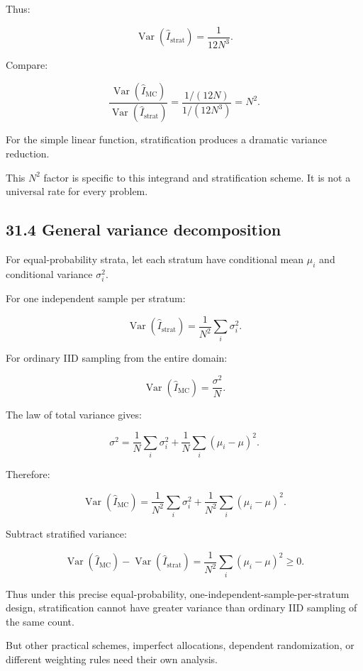 Thus:

\[ \boxed{ \operatorname{Var}(\widehat I_{\mathrm{strat}}) = \frac1{12N^3} }. \]

Compare:

\[ \frac{ \operatorname{Var}(\widehat I_{\mathrm{MC}}) }{ \operatorname{Var}(\widehat I_{\mathrm{strat}}) } = \frac{1/(12N)}{1/(12N^3)} = \boxed{N^2}. \]

For the simple linear function, stratification produces a dramatic variance reduction.

This \(N^2\) factor is specific to this integrand and stratification scheme. It is not a universal rate for every problem.

\subsection{31.4 General variance decomposition}\label{02-foundations-ii-ch031-general-variance-decomposition}

\hypertarget{02-foundations-ii-ch031-general-variance-decomposition}{}

For equal-probability strata, let each stratum have conditional mean \(\mu_i\) and conditional variance \(\sigma_i^2\).

For one independent sample per stratum:

\[ \boxed{ \operatorname{Var}(\widehat I_{\mathrm{strat}}) = \frac1{N^2}\sum_i\sigma_i^2 }. \]

For ordinary IID sampling from the entire domain:

\[ \operatorname{Var}(\widehat I_{\mathrm{MC}}) = \frac{\sigma^2}{N}. \]

The law of total variance gives:

\[ \sigma^2= \frac1N\sum_i\sigma_i^2 + \frac1N\sum_i(\mu_i-\mu)^2. \]

Therefore:

\[ \operatorname{Var}(\widehat I_{\mathrm{MC}}) = \frac1{N^2}\sum_i\sigma_i^2 + \frac1{N^2}\sum_i(\mu_i-\mu)^2. \]

Subtract stratified variance:

\[ \boxed{ \operatorname{Var}(\widehat I_{\mathrm{MC}}) - \operatorname{Var}(\widehat I_{\mathrm{strat}}) = \frac1{N^2}\sum_i(\mu_i-\mu)^2 \ge0 }. \]

Thus under this precise equal-probability, one-independent-sample-per-stratum design, stratification cannot have greater variance than ordinary IID sampling of the same count.

But other practical schemes, imperfect allocations, dependent randomization, or different weighting rules need their own analysis.

